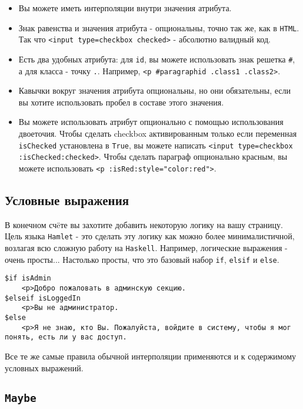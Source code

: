 \begin{itemize}
\item Вы можете иметь интерполяции внутри значения атрибута. 
\item Знак равенства и значения атрибута - опциональны, точно так же, как в \texttt{HTML}.
Так что \lstinline!<input type=checkbox checked>! - абсолютно валидный код.
\item Есть два удобных атрибута: для \lstinline!id!, вы можете использовать знак 
решетка \texttt{\#}, а для класса - точку \texttt{.}. Например, \lstinline!<p #paragraphid .class1 .class2>!.
\item Кавычки вокруг значения атрибута опциональны, но они обязательны, если вы
хотите использовать пробел в составе этого значения.
\item Вы можете использовать атрибут опционально с помощью использования двоеточия.
Чтобы сделать checkbox активированным только если переменная \lstinline!isChecked!
установлена в \lstinline!True!, вы можете написать
\lstinline!<input type=checkbox :isChecked:checked>!.
Чтобы сделать параграф опционально красным, вы можете использовать
\lstinline!<p :isRed:style="color:red">!.
\end{itemize}


\subsection{Условные выражения}

В конечном счëте вы захотите добавить некоторую логику на вашу страницу. Цель
языка \texttt{Hamlet} - это сделать эту логику как можно более минималистичной, возлагая
всю сложную работу на \texttt{Haskell}. Например, логические выражения - очень просты...
Настолько просты, что это базовый набор \texttt{if}, \texttt{elsif} и 
\texttt{else}.

\begin{lstlisting}
$if isAdmin
    <p>Добро пожаловать в админскую секцию.
$elseif isLoggedIn
    <p>Вы не администратор.
$else
    <p>Я не знаю, кто Вы. Пожалуйста, войдите в систему, чтобы я мог понять, есть ли у вас доступ.
\end{lstlisting}

Все те же самые правила обычной интерполяции применяются и к содержимому 
условных выражений.

\subsection{\lstinline!Maybe!}

